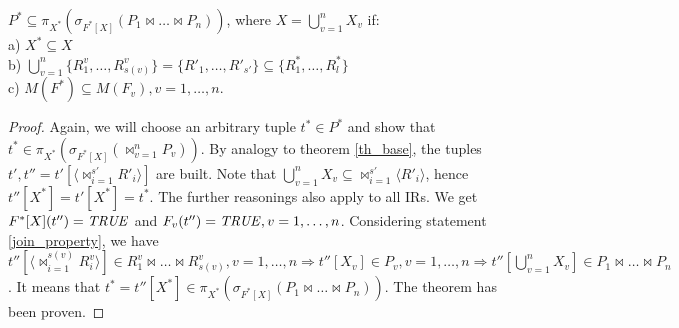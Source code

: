 \def \bigcupn {\bigcup\limits_{v=1}^{n}}
\begin{theorem}
$P^{\ast} \subseteq \pi_{X^{\ast}} ( \sigma_{F^{\ast}[X]} (P_1 \Join \dots \Join P_n))$, where $X = \bigcupn X_{v}$ if:
\\a) $X^{\ast} \subseteq X$
\\b)
$ \bigcupn \{R^{v}_{1}, \ldots, R^{v}_{s(v)}\} = \{R'_{1}, \ldots, R'_{s'}\}
\subseteq
\{R^{\ast}_{1}, \ldots, R^{\ast}_{l}\} $
\\c) $M(F^{\ast}) \subseteq M(F_{v}), v = 1,\dots,n $.

\label{th_mult}
\end{theorem}
\begin{proof}
Again, we will choose an arbitrary tuple $t^{\ast} \in P^{\ast}$
and show that $t^{\ast} \in \pi_{X^{\ast}} ( \sigma_{F^{\ast}[X]}
(\Join_{v=1}^{n} P_{v}))$. By analogy to theorem \ref{th_base}, the tuples $t',
t'' = t'[\langle {\Join}_{i=1}^{s'} R'_i \rangle]$ are built.
Note that  $\bigcupn X_{v} \subseteq {\Join}_{i=1}^{s'} \langle R'_i \rangle$, hence
$t''[X^{\ast}] = t'[X^{\ast}] = t^{\ast}$.
The further reasonings also apply to all IRs.
We get $F^{\ast} [X] (t'') = \mathit{TRUE}$ and $F_v (t'') = \mathit{TRUE}, v = 1,\dots,n $.
Considering statement \ref{join_property}, we have $t''[\langle \Join_{i=1}^{s(v)} R^v_i \rangle]
\in 
R^v_1 \Join \dots \Join R^v_{s(v)}, v = 1, \dots, n
\Rightarrow   
t''[X_v] \in P_v, v = 1, \dots, n
\Rightarrow
t''[\bigcupn X_{v}] \in P_1 \Join \dots \Join P_n$.
It means that $t^{\ast} = t''[X^{\ast}] \in 
\pi_{X^{\ast}} ( \sigma_{F^{\ast}[X]} (P_1 \Join \dots \Join P_n))$.
The theorem has been proven.
\end{proof}

